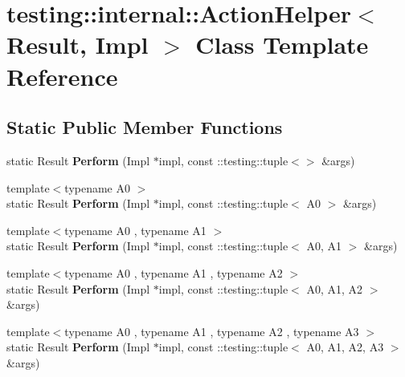 \hypertarget{classtesting_1_1internal_1_1ActionHelper}{}\section{testing\+:\+:internal\+:\+:Action\+Helper$<$ Result, Impl $>$ Class Template Reference}
\label{classtesting_1_1internal_1_1ActionHelper}
\subsection*{Static Public Member Functions}
\begin{DoxyCompactItemize}
\item 
\mbox{\label{classtesting_1_1internal_1_1ActionHelper_a25176836b0a381d883d61c3a2dc60662}} 
static Result {\bfseries Perform} (Impl $\ast$impl, const \+::testing\+::tuple$<$$>$ \&args)
\item 
\mbox{\label{classtesting_1_1internal_1_1ActionHelper_a08d2e199b0a3a1f9e05982cae07db3ec}} 
{\footnotesize template$<$typename A0 $>$ }\\static Result {\bfseries Perform} (Impl $\ast$impl, const \+::testing\+::tuple$<$ A0 $>$ \&args)
\item 
\mbox{\label{classtesting_1_1internal_1_1ActionHelper_a96d8d8399ff3322e77ba1de51c166f4e}} 
{\footnotesize template$<$typename A0 , typename A1 $>$ }\\static Result {\bfseries Perform} (Impl $\ast$impl, const \+::testing\+::tuple$<$ A0, A1 $>$ \&args)
\item 
\mbox{\label{classtesting_1_1internal_1_1ActionHelper_ad450478d185cbcac0e1383f7517f5c36}} 
{\footnotesize template$<$typename A0 , typename A1 , typename A2 $>$ }\\static Result {\bfseries Perform} (Impl $\ast$impl, const \+::testing\+::tuple$<$ A0, A1, A2 $>$ \&args)
\item 
\mbox{\label{classtesting_1_1internal_1_1ActionHelper_a2ceda08aeb7b9fd1ad6ccb0821a3ea39}} 
{\footnotesize template$<$typename A0 , typename A1 , typename A2 , typename A3 $>$ }\\static Result {\bfseries Perform} (Impl $\ast$impl, const \+::testing\+::tuple$<$ A0, A1, A2, A3 $>$ \&args)
$$
\end{DoxyCompactItemize}
